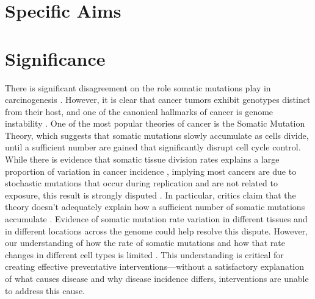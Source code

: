




% 


\section{Specific Aims} %



\clearpage


\section{Significance}

There is significant disagreement on the role somatic mutations play in carcinogenesis \parencite{baker_cancer_2015}.
However, it is clear that cancer tumors exhibit genotypes distinct from their host, and one of the canonical hallmarks of cancer is genome instability \parencite{hanahan_hallmarks_2000, hanahan_hallmarks_2011}.
One of the most popular theories of cancer is the Somatic Mutation Theory, which suggests that somatic mutations slowly accumulate as cells divide, until a sufficient number are gained that significantly disrupt cell cycle control.
While there is evidence that somatic tissue division rates explains a large proportion of variation in cancer incidence \parencite{tomasetti_variation_2015}, implying most cancers are due to stochastic mutations that occur during replication and are not related to exposure, this result is strongly disputed \parencite{rozhok_critical_2015, wang_implications_2015}. In particular, critics claim that the theory doesn't adequately explain how a sufficient number of somatic mutations accumulate \parencite{baker_cancer_2015}. 
Evidence of somatic mutation rate variation in different tissues and in different locations across the genome could help resolve this dispute.
However, our understanding of how the rate of somatic mutations and how that rate changes in different cell types is limited \parencite{stratton_cancer_2009}.
This understanding is critical for creating effective preventative interventions---without a satisfactory explanation of what causes disease and why disease incidence differs, interventions are unable to address this cause.

